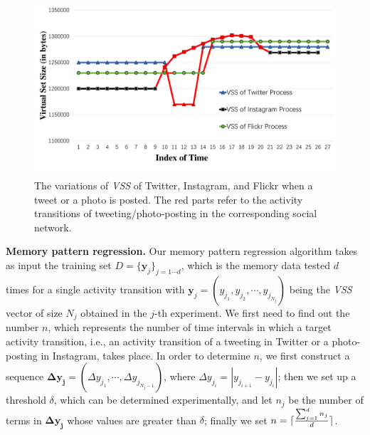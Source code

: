 \documentclass[letterpaper,12pt]{article}
\DeclarePairedDelimiter{\ceil}{\lceil}{\rceil}
\begin{document}
\begin{figure}[!htb]
  \includegraphics[width=\textwidth]{activity-memory.pdf}
  \caption{The variations of \emph{VSS} of Twitter, Instagram, and Flickr when a tweet or a photo is posted. The red parts refer to the activity transitions of tweeting/photo-posting in the corresponding social network.}
  \label{fig:memory-activity}
\end{figure}


{\noindent \bf Memory pattern regression.}
Our memory pattern regression algorithm takes as input the training set $D=\{\mathbf{y}_j\}_{j=1\cdots d}$, which is the memory data tested $d$ times for a single activity transition with $\mathbf{y}_j = (y_{j_1}, y_{j_2}, \cdots, y_{j_{N_j}})$ being the \emph{VSS} vector of size $N_j$ obtained in the $j$-th experiment. We first need to find out the number $n$, which represents the number of time intervals in which a target activity transition, i.e., an activity transition of a tweeting in Twitter or a photo-posting in Instagram, takes place. In order to determine $n$, we first construct a sequence $\mathbf{\Delta y_j} = (\Delta y_{j_1},\cdots,\Delta y_{j_{N_j-1}})$, where $\Delta y_{j_i}=|y_{j_{i+1}}-y_{j_i}|$; %
then we set up a threshold $\delta$, which can be determined experimentally, and let $n_j$ be the number of terms in $\mathbf{\Delta y_j}$ whose values are greater than $\delta$; finally %
we set $n=\ceil{\frac{\sum_{j=1}^{d} n_j}{d}}$.
\end{document}
